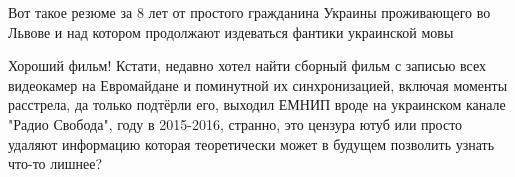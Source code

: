 \begin{itemize}
Вот такое резюме за 8 лет от простого гражданина Украины проживающего во Львове
и над котором продолжают издеваться фантики украинской мовы


Хороший фильм! Кстати, недавно хотел найти сборный фильм с записью всех
видеокамер на Евромайдане и поминутной их синхронизацией, включая моменты
расстрела, да только подтёрли его, выходил ЕМНИП вроде на украинском канале
"Радио Свобода", году в 2015-2016, странно, это цензура ютуб или просто удаляют
информацию которая теоретически может в будущем позволить узнать что-то лишнее?

\end{itemize} %
